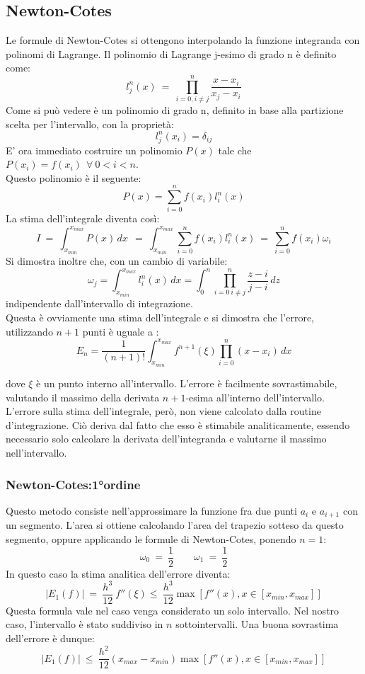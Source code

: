 \subsection{Newton-Cotes}
Le formule di Newton-Cotes si ottengono interpolando la funzione integranda con polinomi di Lagrange.
Il polinomio di Lagrange j-esimo di grado n è definito come:
$$
	l_j^n (x)\ = \ \prod_{i = 0, i \ne j}^{n} \frac{x-x_i}{x_j - x_i}
$$
	Come si può vedere è un polinomio di grado n, definito in base alla partizione scelta per l'intervallo, con la proprietà:
$$
	l_j^n ( x_i) = \delta_{ij}
$$
E' ora immediato costruire un polinomio $P(x)$ tale che $ P(x_i) = f(x_i) \ \ \forall \   0<i<n$.\\
Questo polinomio è il seguente:
$$
	P(x) = \sum_{i = 0}^n f(x_i) l_i^n(x)
$$
La stima dell'integrale diventa così:
$$
 I \ = \ \int_{x_{min}}^{x_{max}} P(x) \, dx \ \ = \ \int_{x_{min}}^{x_{max}} \sum_{i = 0}^n f(x_i) l_i^n(x)  \ =  \ \sum_{i = 0}^n f(x_i) \omega_i 
$$
 Si dimostra inoltre che, con un cambio di variabile:
 $$
 \omega_j = \int_{x_{min}}^{x_{max}} l_i^n(x) \,dx  = \int_{0}^{n} \prod_{i = 0 \ i \ne j}^n \frac{z-i}{j-i}\,dz 
$$
indipendente dall'intervallo di integrazione.\\
Questa è ovviamente una stima dell'integrale e si dimostra che l'errore, utilizzando $n+1$ punti è uguale a :
$$
 E_n = \frac{1}{(n+1)!} \int_{x_{min}}^{x_{max}} f^{n+1}(\xi) \prod_{i = 0}^n {(x-x_i)} \, dx 
 $$

 dove $\xi$ è un punto interno all'intervallo. L'errore è facilmente sovrastimabile, valutando il massimo della derivata $n+1$-esima all'interno dell'intervallo. L'errore sulla stima dell'integrale,
però, non viene calcolato dalla routine d'integrazione. Ciò deriva dal fatto che esso è stimabile analiticamente,
essendo necessario solo calcolare la derivata dell'integranda e valutarne il massimo nell'intervallo.

\subsubsection{Newton-Cotes:1°ordine}
Questo metodo consiste nell'approssimare la funzione fra due punti $a_i$ e $a_{i+1}$ con un segmento.
L'area si ottiene calcolando l'area del trapezio sotteso da questo segmento, oppure applicando le formule di Newton-Cotes, ponendo $ n = 1$: 
$$
\omega_0 \ = \ \frac{1}{2} \qquad \omega_1 \ = \ \frac{1}{2}
$$
In questo caso la stima analitica dell'errore diventa:
$$
| E_1(f) |  \ = \ \frac{h^3}{12} \ f''(\xi) \leq \  \frac{h^3}{12} \max \left[ f''(x), x \in [x_{min},x_{max}] \right]
$$
Questa formula vale nel caso venga considerato un solo intervallo. Nel nostro caso, l'intervallo è stato suddiviso in $n$ sottointervalli. Una buona sovrastima dell'errore è dunque:
$$
| E_1(f) |  \ \leq \ \frac{h^2}{12}\left( x_{max} - x_{min} \right) \max \left[ f''(x), x \in [x_{min},x_{max}] \right]
$$
